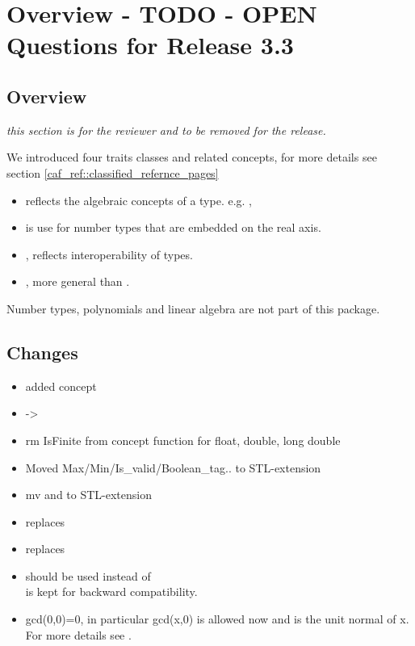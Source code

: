 \section{Overview - TODO - OPEN Questions for Release 3.3}

\subsection{Overview}
{\em this section is for the reviewer and to be removed for the release. }

We introduced four traits classes and related concepts, for more details see 
section \ref{caf_ref::classified_refernce_pages}
\begin{itemize}
\item {} reflects the algebraic concepts of a 
      type. e.g. , 
\item {} is use for number types that are embedded on 
      the real axis. 
\item {}, reflects interoperability of types. 
\item {}, more general than .
\end{itemize}

Number types, polynomials and linear algebra are not part of this package. 

\subsection{Changes}
\begin{itemize}
\item added concept 
\item {} -> 
\item rm IsFinite from  concept
      function  for float, double, long double 
\item Moved Max/Min/Is\_valid/Boolean\_tag.. to STL-extension 
\item mv  and  
      to STL-extension
\item {} replaces 
\item {} replaces  
\item {} should be used instead of \\
       is kept for backward compatibility.
\item gcd(0,0)=0, in particular gcd(x,0) is allowed now and is the unit normal 
      of x. For more details see . \\
\end{itemize}

